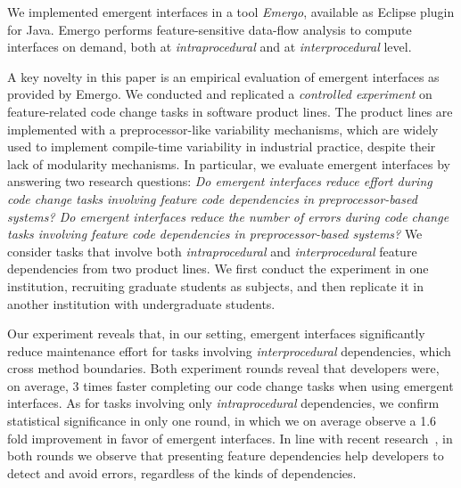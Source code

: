We implemented emergent interfaces in a tool \emph{Emergo}, available as Eclipse plugin for Java. Emergo performs feature-sensitive data-flow analysis to compute interfaces on demand, both at \textit{intraprocedural} and at \textit{interprocedural} level.

A key novelty in this paper is an empirical evaluation of emergent interfaces as provided by Emergo. We conducted and replicated a \emph{controlled experiment} on feature-related code change tasks in software product lines. The product lines are implemented with a preprocessor-like variability mechanisms, which are widely used to implement compile-time variability in industrial practice, despite their lack of modularity mechanisms.
In particular, we evaluate emergent interfaces by answering two research questions: \textit{Do emergent interfaces reduce effort during code change tasks involving feature code dependencies in preprocessor-based systems? Do emergent interfaces reduce the number of errors during code change tasks involving feature code dependencies in preprocessor-based systems?} We consider tasks that involve both \textit{intraprocedural} and \textit{interprocedural} feature dependencies from two product lines. We first conduct the experiment in one institution, recruiting graduate students as subjects, and then replicate it in another institution with undergraduate students. %

Our experiment reveals that, in our setting, emergent interfaces significantly reduce maintenance effort for tasks involving \textit{interprocedural} dependencies, which cross method boundaries. Both experiment rounds reveal that developers were, on average, 3 times faster completing our code change tasks when using emergent interfaces. As for tasks involving only \textit{intraprocedural} dependencies, we confirm statistical significance in only one round, in which we on average observe a 1.6 fold improvement in favor of emergent interfaces. In line with recent research~\cite{yin-fixes-become-bugs-fse11}, in both rounds we observe that presenting feature dependencies help developers to detect and avoid errors, regardless of the kinds of dependencies.

